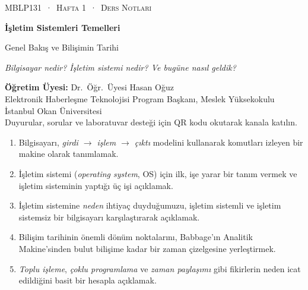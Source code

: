 \documentclass[11pt,a4paper]{article}
\begin{document}
\thispagestyle{empty}
\begin{tcolorbox}[enhanced,colback=dark,colframe=dark,arc=0pt,boxrule=0pt,
  left=18pt,right=18pt,top=20pt,bottom=20pt,coltext=white]
{\small\color{mint}\textsc{MBLP131 \,·\, Hafta 1 \,·\, Ders Notları}}\par\medskip
{\headfont\fontsize{26}{30}\selectfont\bfseries İşletim Sistemleri Temelleri}\par\medskip
{\large Genel Bakış ve Bilişimin Tarihi}\par\smallskip
{\small\itshape\color{white!70} Bilgisayar nedir? İşletim sistemi nedir? Ve bugüne nasıl geldik?}
\end{tcolorbox}

\vspace{0.4em}
\begin{minipage}[t]{0.70\linewidth}
\small
\textbf{Öğretim Üyesi:} Dr.\ Öğr.\ Üyesi Hasan Oğuz\\
Elektronik Haberleşme Teknolojisi Program Başkanı, Meslek Yüksekokulu\\
İstanbul Okan Üniversitesi\\[0.3em]
{\color{muted}Duyurular, sorular ve laboratuvar desteği için QR kodu okutarak kanala katılın.}
\end{minipage}

\vspace{0.8em}
\begin{keyidea}
\begin{enumerate}[leftmargin=1.4em]
  \item Bilgisayarı, \emph{girdi $\to$ işlem $\to$ çıktı} modelini kullanarak komutları izleyen bir makine olarak tanımlamak.
  \item İşletim sistemi (\emph{operating system}, OS) için ilk, işe yarar bir tanım vermek ve işletim sisteminin yaptığı üç işi açıklamak.
  \item İşletim sistemine \emph{neden} ihtiyaç duyduğumuzu, işletim sistemli ve işletim sistemsiz bir bilgisayarı karşılaştırarak açıklamak.
  \item Bilişim tarihinin önemli dönüm noktalarını, Babbage'ın Analitik Makine'sinden bulut bilişime kadar bir zaman çizelgesine yerleştirmek.
  \item \emph{Toplu işleme}, \emph{çoklu programlama} ve \emph{zaman paylaşımı} gibi fikirlerin neden icat edildiğini basit bir hesapla açıklamak.
\end{enumerate}
\end{keyidea}
\end{document}
